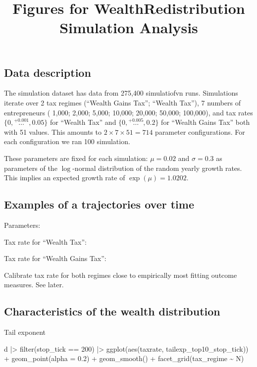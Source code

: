 \documentclass[
  letterpaper,
  DIV=11,
  numbers=noendperiod]{scrartcl}
\title{Figures for WealthRedistribution Simulation Analysis}
\author{}
\date{}
\newenvironment{Shaded}{\begin{snugshade}}{\end{snugshade}}
\newcommand{\AttributeTok}[1]{\textcolor[rgb]{0.40,0.45,0.13}{#1}}
\newcommand{\DecValTok}[1]{\textcolor[rgb]{0.68,0.00,0.00}{#1}}
\newcommand{\FloatTok}[1]{\textcolor[rgb]{0.68,0.00,0.00}{#1}}
\newcommand{\FunctionTok}[1]{\textcolor[rgb]{0.28,0.35,0.67}{#1}}
\newcommand{\NormalTok}[1]{\textcolor[rgb]{0.00,0.23,0.31}{#1}}
\newcommand{\SpecialCharTok}[1]{\textcolor[rgb]{0.37,0.37,0.37}{#1}}
\begin{document}
\maketitle


\subsection{Data description}\label{data-description}

The simulation dataset has data from 275,400 simulatiofvn runs.
Simulations iterate over 2 tax regimes (``Wealth Gains Tax''; ``Wealth
Tax''), 7 numbers of entrepreneurs ( 1,000; 2,000; 5,000; 10,000;
20,000; 50,000; 100,000), and tax rates
\(\{0,\stackrel{+0.001}{\dots},0.05\}\) for ``Wealth Tax'' and
\(\{0,\stackrel{+0.005}{\dots},0.2\}\) for ``Wealth Gains Tax'' both
with 51 values. This amounts to \(2 \times 7 \times 51 = 714\) parameter
configurations. For each configuration we ran 100 simulation.

These parameters are fixed for each simulation: \(\mu = 0.02\) and
\(\sigma = 0.3\) as parameters of the \(\log\)-normal distribution of
the random yearly growth rates. This implies an expected growth rate of
\(\exp(\mu) = 1.0202\).

\subsection{Examples of a trajectories over
time}\label{examples-of-a-trajectories-over-time}

Parameters:

Tax rate for ``Wealth Tax'':

Tax rate for ``Wealth Gains Tax'':

Calibrate tax rate for both regimes close to empirically most fitting
outcome measures. See later.

\subsection{Characteristics of the wealth
distribution}\label{characteristics-of-the-wealth-distribution}

Tail exponent

\begin{Shaded}
\begin{Highlighting}[]
\NormalTok{d }\SpecialCharTok{|\textgreater{}} \FunctionTok{filter}\NormalTok{(stop\_tick }\SpecialCharTok{==} \DecValTok{200}\NormalTok{) }\SpecialCharTok{|\textgreater{}} 
 \FunctionTok{ggplot}\NormalTok{(}\FunctionTok{aes}\NormalTok{(taxrate, tailexp\_top10\_stop\_tick)) }\SpecialCharTok{+}
 \FunctionTok{geom\_point}\NormalTok{(}\AttributeTok{alpha =} \FloatTok{0.2}\NormalTok{) }\SpecialCharTok{+}
 \FunctionTok{geom\_smooth}\NormalTok{() }\SpecialCharTok{+}
 \FunctionTok{facet\_grid}\NormalTok{(tax\_regime }\SpecialCharTok{\textasciitilde{}}\NormalTok{ N)}
\end{Highlighting}
\end{Shaded}
\end{document}
